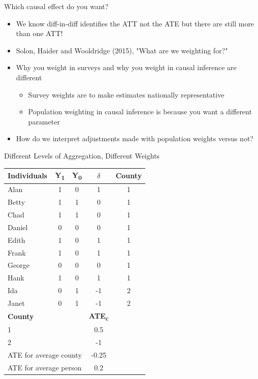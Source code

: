 \documentclass{beamer}
\begin{document}
\begin{frame}{Which causal effect do you want?}

\begin{itemize}
\item We know diff-in-diff identifies the ATT not the ATE but there are still more than one ATT!
\item Solon, Haider and Wooldridge (2015), "What are we weighting for?"
\item Why you weight in surveys and why you weight in causal inference are different
	\begin{itemize}
	\item Survey weights are to make estimates nationally representative
	\item Population weighting in causal inference is because you want a different parameter
	\end{itemize}
\item How do we interpret adjustments made with population weights versus not?
\end{itemize}

\end{frame}




\begin{frame}{Different Levels of Aggregation, Different Weights}

\begin{table}[htbp]\centering
\footnotesize
\begin{tabular}{lcccc}
\toprule
\textbf{Individuals} & \textbf{Y\textsubscript{1}} & \textbf{Y\textsubscript{0}} & \textbf{$\delta$} & \textbf{County} \\
\midrule
Alan    & 1 & 0 & 1  & \cellcolor{yellow!30}1 \\
Betty   & 1 & 1 & 0  & \cellcolor{yellow!30}1 \\
Chad    & 1 & 1 & 0  & \cellcolor{yellow!30}1 \\
Daniel  & 0 & 0 & 0  & \cellcolor{yellow!30}1 \\
Edith   & 1 & 0 & 1  & \cellcolor{yellow!30}1 \\
Frank   & 1 & 0 & 1  & \cellcolor{yellow!30}1 \\
George  & 0 & 0 & 0  & \cellcolor{yellow!30}1 \\
Hank    & 1 & 0 & 1  & \cellcolor{yellow!30}1 \\
Ida     & 0 & 1 & -1 & \cellcolor{green!20}2 \\
Janet   & 0 & 1 & -1 & \cellcolor{green!20}2 \\
\midrule
\textbf{County} & & & \textbf{ATE\textsubscript{c}} & \\
\cellcolor{yellow!30}1 & & & \cellcolor{yellow!30}0.5 & \\
\cellcolor{green!20}2 & & & \cellcolor{green!20}-1 & \\
\midrule
\multicolumn{3}{l}{ATE for average county} & -0.25 & \\
\multicolumn{3}{l}{ATE for average person}   & 0.2 & \\
\bottomrule
\end{tabular}
\end{table}


\end{frame}
\end{document}
